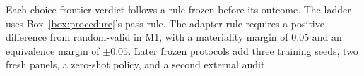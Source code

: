 Each choice-frontier verdict follows a rule frozen before its outcome. The ladder uses Box~\ref{box:procedure}'s pass rule. The adapter rule requires a positive difference from random-valid in M1, with a materiality margin of 0.05 and an equivalence margin of $\pm 0.05$. Later frozen protocols add three training seeds, two fresh panels, a zero-shot policy, and a second external audit.

